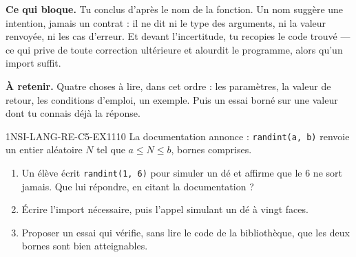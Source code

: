 

\textbf{Ce qui bloque.} Tu conclus d'après le nom de la fonction. Un nom suggère une intention,
jamais un contrat : il ne dit ni le type des arguments, ni la valeur renvoyée, ni les cas
d'erreur. Et devant l'incertitude, tu recopies le code trouvé — ce qui prive de toute
correction ultérieure et alourdit le programme, alors qu'un import suffit.

\textbf{À retenir.} Quatre choses à lire, dans cet ordre : les paramètres, la valeur de retour,
les conditions d'emploi, un exemple. Puis un essai borné sur une valeur dont tu connais déjà
la réponse.

\begin{exercice}{1NSI-LANG-RE-C5-EX1}{1}{10}
La documentation annonce : \lstinline{randint(a, b)} renvoie un entier aléatoire $N$ tel que
$a \leq N \leq b$, bornes comprises.
\begin{enumerate}
  \item Un élève écrit \lstinline{randint(1, 6)} pour simuler un dé et affirme que le $6$ ne
        sort jamais. Que lui répondre, en citant la documentation ?
  \item Écrire l'import nécessaire, puis l'appel simulant un dé à vingt faces.
  \item Proposer un essai qui vérifie, sans lire le code de la bibliothèque, que les deux
        bornes sont bien atteignables.
\end{enumerate}
\end{exercice}

